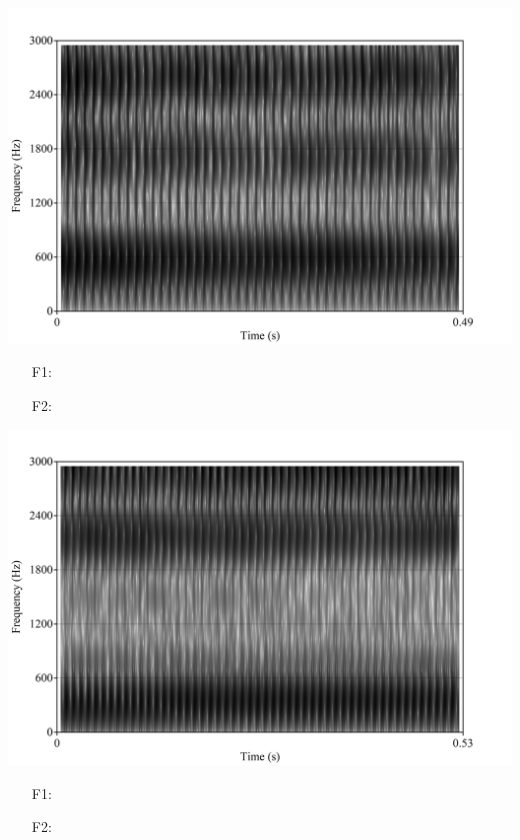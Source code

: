 \documentclass[addpoints]{exam}
\begin{document}
\begin{questions}
      \newpage
      \question[1]
        \begin{minipage}{0.45\linewidth}
          \includegraphics[scale=0.6]{vowel4.jpg}
        \end{minipage}\hspace{0.1\linewidth}
        \begin{minipage}{0.45\linewidth}
          \begin{itemize}
            \item[F1:] \hrulefill
            \item[F2:] \hrulefill
          \end{itemize}
        \end{minipage}
      \question[1]
        \begin{minipage}{0.45\linewidth}
          \includegraphics[scale=0.6]{vowel2.jpg}
        \end{minipage}\hspace{0.1\linewidth}
        \begin{minipage}{0.45\linewidth}
          \begin{itemize}
            \item[F1:] \hrulefill
            \item[F2:] \hrulefill
          \end{itemize}
        \end{minipage}
  \end{questions}

  \vspace{1.25cm}

  \begin{center}
    \gradetable[v][pages]
  \end{center}
\end{document}
